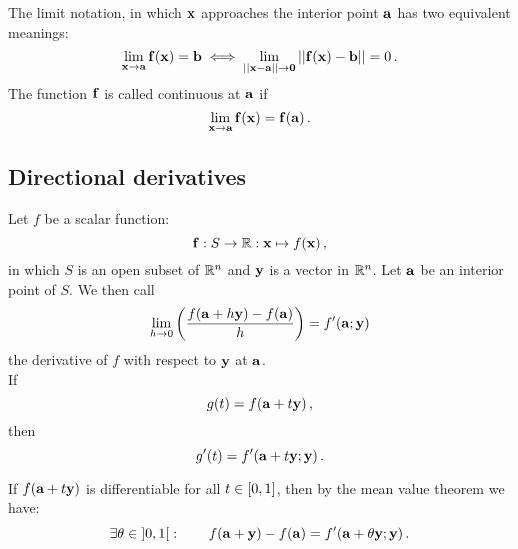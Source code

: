         The limit notation, in which $\vb{x}$ approaches the interior point $\vb{a}$ has two equivalent meanings:
        \begin{equation}
            \lim_{\vb{x} \to \vb{a}} \vb{f}(\vb{x}) = \vb{b} \iff \lim_{ ||\vb{x} - \vb{a}|| \to \vb{0}} ||\vb{f}(\vb{x}) - \vb{b}|| = 0 \thinspace .
        \end{equation}
        The function $\vb{f}$ is called continuous at $\vb{a}$ if
        \begin{equation}
            \lim_{\vb{x} \to \vb{a}} \vb{f}(\vb{x}) = \vb{f}(\vb{a}) \thinspace .
        \end{equation}

    \subsection{Directional derivatives}
        Let $f$ be a scalar function:
        \begin{equation}
            \vb{f}: S \rightarrow \mathbb{R}: \vb{x} \mapsto f(\vb{x}) \thinspace ,
        \end{equation}
        in which $S$ is an open subset of $\mathbb{R}^n$ and $\vb{y}$ is a vector in $\mathbb{R}^n$. Let $\vb{a}$ be an interior point of $S$. We then call
        \begin{equation}
            \lim_{h \to 0} \qty( \frac{f(\vb{a} + h\vb{y}) - f(\vb{a})}{h} ) = f'(\vb{a};\vb{y})
        \end{equation}
        the derivative of $f$ with respect to $\vb{y}$ at $\vb{a}$. \\

        If
        \begin{equation}
            g(t) = f(\vb{a} + t \vb{y}) \thinspace ,
        \end{equation}
        then
        \begin{equation}
            g'(t) = f'(\vb{a} + t \vb{y}; \vb{y}) \thinspace .
        \end{equation}

        If $f(\vb{a} + t \vb{y})$ is differentiable for all $t \in \interval{0}{1}$, then by the mean value theorem we have:
        \begin{equation}
            \exists \theta \in \interval[open]{0}{1}: \qquad f(\vb{a} + \vb{y}) - f(\vb{a}) = f'(\vb{a} + \theta \vb{y}; \vb{y}) \thinspace .
        \end{equation}

